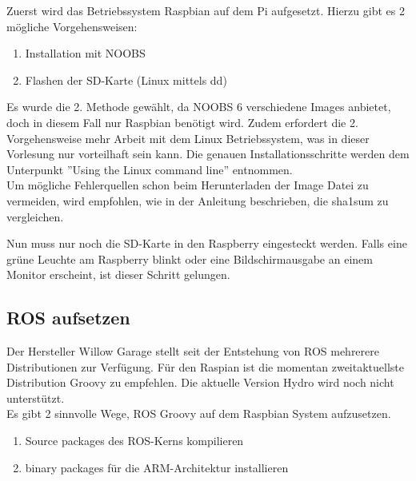 \documentclass[12pt]{article}
\begin{document}
Zuerst wird das Betriebssystem Raspbian auf dem Pi aufgesetzt.
Hierzu gibt es 2 mögliche Vorgehensweisen:
\begin{enumerate}
\item Installation mit NOOBS
\item Flashen der SD-Karte (Linux mittels dd)
\end{enumerate}

Es wurde die 2. Methode gewählt, da NOOBS 6 verschiedene Images anbietet, doch in diesem Fall nur Raspbian benötigt wird.
Zudem erfordert die 2. Vorgehensweise mehr Arbeit mit dem Linux Betriebssystem, was in dieser Vorlesung nur vorteilhaft sein kann.
Die genauen Installationsschritte werden dem Unterpunkt ''Using the Linux command line'' entnommen. \cite{SDCard}
\\
Um mögliche Fehlerquellen schon beim Herunterladen der Image Datei zu vermeiden, wird empfohlen, wie in der Anleitung beschrieben, die sha1sum zu vergleichen.

Nun muss nur noch die SD-Karte in den Raspberry eingesteckt werden. Falls eine grüne Leuchte am Raspberry blinkt oder eine Bildschirmausgabe an einem Monitor erscheint, ist dieser Schritt gelungen.

\subsection{ROS aufsetzen}
Der Hersteller Willow Garage stellt seit der Entstehung von ROS mehrerere Distributionen zur Verfügung.
Für den Raspian ist die momentan zweitaktuellste Distribution Groovy zu empfehlen. 
Die aktuelle Version Hydro wird noch nicht unterstützt. \\
Es gibt 2 sinnvolle Wege, ROS Groovy auf dem Raspbian System aufzusetzen.
\begin{enumerate}
\item Source packages des ROS-Kerns kompilieren
\item binary packages für die ARM-Architektur installieren
\end{enumerate}
\end{document}
